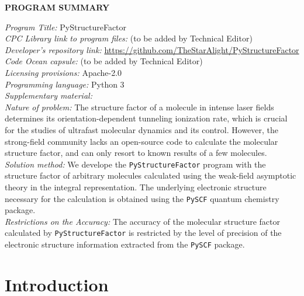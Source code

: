\documentclass[preprint,12pt]{elsarticle} %
\begin{document}
{\bf PROGRAM SUMMARY}
\begin{small}
\noindent
{\em Program Title:} PyStructureFactor \\
{\em CPC Library link to program files:} (to be added by Technical Editor) \\
{\em Developer's repository link:} \url{https://github.com/TheStarAlight/PyStructureFactor} \\
{\em Code Ocean capsule:} (to be added by Technical Editor) \\
{\em Licensing provisions:} Apache-2.0 \\
{\em Programming language:} Python 3                                  \\
{\em Supplementary material:}                                 \\
{\em Nature of problem:} The structure factor of a molecule in intense laser fields determines its orientation-dependent tunneling ionization rate, which is crucial for the studies of ultrafast molecular dynamics and its control. However, the strong-field community lacks an open-source code to calculate the molecular structure factor, and can only resort to known results of a few molecules. \\
{\em Solution method:} We develope the \texttt{PyStructureFactor} program with the structure factor of arbitrary molecules calculated using the weak-field asymptotic theory in the integral representation. The underlying electronic structure necessary for the calculation is obtained using the \texttt{PySCF} quantum chemistry package. \\
{\em Restrictions on the Accuracy:} The accuracy of the molecular structure factor calculated by \texttt{PyStructureFactor} is restricted by the level of precision of the electronic structure information extracted from the \texttt{PySCF} package. \\
\end{small}


\section{Introduction}
\label{sec:intro}
\end{document}
